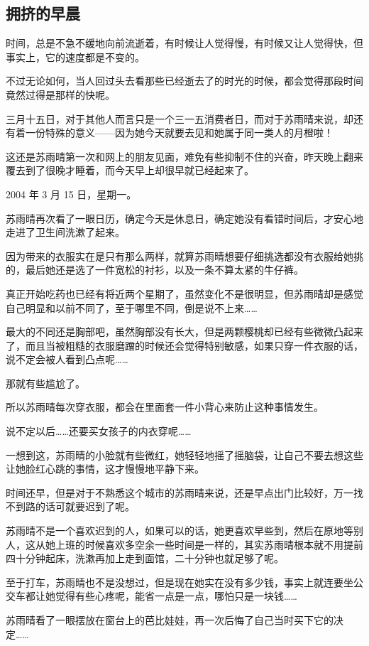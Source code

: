 \subsection{拥挤的早晨}

时间，总是不急不缓地向前流逝着，有时候让人觉得慢，有时候又让人觉得快，但事实上，它的速度都是不变的。

不过无论如何，当人回过头去看那些已经逝去了的时光的时候，都会觉得那段时间竟然过得是那样的快呢。

三月十五日，对于其他人而言只是一个三一五消费者日，而对于苏雨晴来说，却还有着一份特殊的意义——因为她今天就要去见和她属于同一类人的月橙啦！

这还是苏雨晴第一次和网上的朋友见面，难免有些抑制不住的兴奋，昨天晚上翻来覆去到了很晚才睡着，而今天早上却很早就已经起来了。

2004 年 3 月 15 日，星期一。

苏雨晴再次看了一眼日历，确定今天是休息日，确定她没有看错时间后，才安心地走进了卫生间洗漱了起来。

因为带来的衣服实在是只有那么两样，就算苏雨晴想要仔细挑选都没有衣服给她挑的，最后她还是选了一件宽松的衬衫，以及一条不算太紧的牛仔裤。

真正开始吃药也已经有将近两个星期了，虽然变化不是很明显，但苏雨晴却是感觉自己明显和以前不同了，至于哪里不同，倒是说不上来……

最大的不同还是胸部吧，虽然胸部没有长大，但是两颗樱桃却已经有些微微凸起来了，而且当被粗糙的衣服磨蹭的时候还会觉得特别敏感，如果只穿一件衣服的话，说不定会被人看到凸点呢……

那就有些尴尬了。

所以苏雨晴每次穿衣服，都会在里面套一件小背心来防止这种事情发生。

说不定以后……还要买女孩子的内衣穿呢……

一想到这，苏雨晴的小脸就有些微红，她轻轻地摇了摇脑袋，让自己不要去想这些让她脸红心跳的事情，这才慢慢地平静下来。

时间还早，但是对于不熟悉这个城市的苏雨晴来说，还是早点出门比较好，万一找不到路的话可就要迟到了呢。

苏雨晴不是一个喜欢迟到的人，如果可以的话，她更喜欢早些到，然后在原地等别人，这从她上班的时候喜欢多空余一些时间是一样的，其实苏雨晴根本就不用提前四十分钟起床，洗漱再加上走到面馆，二十分钟也就足够了呢。

至于打车，苏雨晴也不是没想过，但是现在她实在没有多少钱，事实上就连要坐公交车都让她觉得有些心疼呢，能省一点是一点，哪怕只是一块钱……

苏雨晴看了一眼摆放在窗台上的芭比娃娃，再一次后悔了自己当时买下它的决定……

